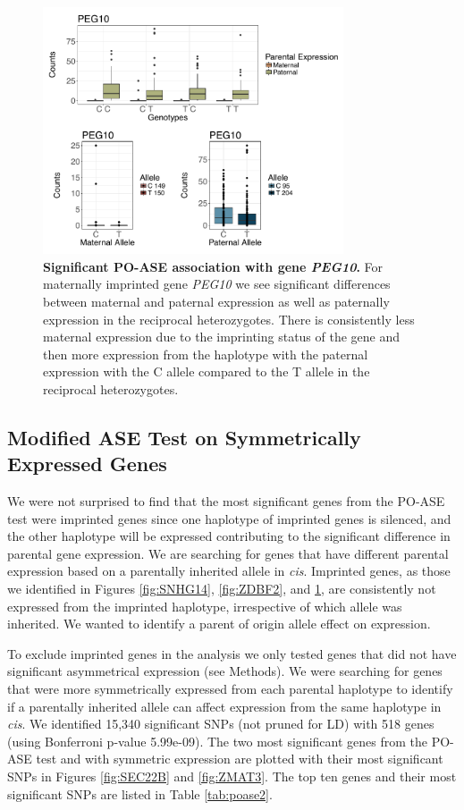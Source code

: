 \begin{figure}[!htb]
\centering \includegraphics[width=3.5in]{img/ch04/PEG10.pdf}
\caption[Significant PO-ASE association with gene \emph{PEG10}.]{\textbf{Significant PO-ASE association with gene \emph{PEG10}.} For maternally imprinted gene \emph{PEG10} we see significant differences between maternal and paternal expression as well as paternally expression in the reciprocal heterozygotes. There is consistently less maternal expression due to the imprinting status of the gene and then more expression from the haplotype with the paternal expression with the C allele compared to the T allele in the reciprocal heterozygotes.}
\label{fig:PEG10}
\end{figure}


\subsection{Modified ASE Test on Symmetrically Expressed Genes}\label{Modified ASE Test on Symmetrically Expressed Genes} 
We were not surprised to find that the most significant genes from the PO-ASE test were imprinted genes since one haplotype of imprinted genes is silenced, and the other haplotype will be expressed contributing to the significant difference in parental gene expression. We are searching for genes that have different parental expression based on a parentally inherited allele in \emph{cis}. Imprinted genes, as those we identified in Figures \ref{fig:SNHG14}, \ref{fig:ZDBF2}, and \ref{fig:PEG10}, are consistently not expressed from the imprinted haplotype, irrespective of which allele was inherited. We wanted to identify a parent of origin allele effect on expression.
 
To exclude imprinted genes in the analysis we only tested genes that did not have significant asymmetrical expression (see Methods). We were searching for genes that were more symmetrically expressed from each parental haplotype to identify if a parentally inherited allele can affect expression from the same haplotype in \emph{cis}. We identified 15,340 significant SNPs (not pruned for LD) with 518 genes (using Bonferroni p-value 5.99e-09). The two most significant genes from the PO-ASE test and with symmetric expression are plotted with their most significant SNPs in Figures \ref{fig:SEC22B} and \ref{fig:ZMAT3}. The top ten genes and their most significant SNPs are listed in Table \ref{tab:poase2}.


